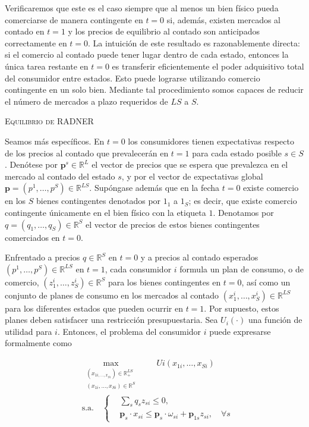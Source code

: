 \documentclass[10pt,a4paper]{article}
\begin{document}
Verificaremos que este es el caso siempre que al menos un bien físico pueda comerciarse de manera contingente en $t=0$ si, además, existen mercados al contado en $t=1$ y los precios de equilibrio al contado son anticipados correctamente en $t=0$. La intuición de este resultado es razonablemente directa: si el comercio al contado puede tener lugar dentro de cada estado, entonces la única tarea restante en $t=0$ es transferir eficientemente el poder adquisitivo total del consumidor entre estados. Esto puede lograrse utilizando comercio contingente en un solo bien. Mediante tal procedimiento somos capaces de reducir el número de mercados a plazo requeridos de $LS$ a $S$.

\textsc{Equilibrio de RADNER}

Seamos más específicos. En $t=0$ los consumidores tienen expectativas respecto de los precios al contado que prevalecerán en $t=1$ para cada estado posible $s\in S$. Denótese por $\mathbf p^s\in\mathbb{R}^L$ el vector de precios que se espera que prevalezca en el mercado al contado del estado $s$, y por el vector de expectativas global $\mathbf p=(p^1,\ldots,p^S)\in\mathbb{R}^{LS}$. Supóngase además que en la fecha $t=0$ existe comercio en los $S$ bienes contingentes denotados por $1_1$ a $1_S$; es decir, que existe comercio contingente únicamente en el bien físico con la etiqueta $1$. Denotamos por $q=(q_1,\ldots,q_S)\in\mathbb{R}^S$ el vector de precios de estos bienes contingentes comerciados en $t=0$.

Enfrentado a precios $q\in\mathbb{R}^S$ en $t=0$ y a precios al contado esperados $(p^1,\ldots,p^S)\in\mathbb{R}^{LS}$ en $t=1$, cada consumidor $i$ formula un plan de consumo, o de comercio, $(z^i_1,\ldots,z^i_S)\in\mathbb{R}^S$ para los bienes contingentes en $t=0$, así como un conjunto de planes de consumo en los mercados al contado $(x^i_1,\ldots,x^i_S)\in\mathbb{R}^{LS}$ para los diferentes estados que pueden ocurrir en $t=1$. Por supuesto, estos planes deben satisfacer una restricción presupuestaria. Sea $U_i(\cdot)$ una función de utilidad para $i$. Entonces, el problema del consumidor $i$ puede expresarse formalmente como

$$\begin{aligned}
    &\max_{\begin{aligned}
        (x_{1i,\ldots,x_{Si}})\in\mathbb R^{LS}_+\\[0.5em]
        (x_{1i},\ldots,x_{Si})\in\mathbb R^{S}
    \end{aligned}}\qquad Ui(x_{1i},\ldots,x_{Si})\\[1em]
    &\text{s.a.}\quad \left\{\begin{aligned}
        &\sum_{s}q_sz_{si}\leq0,\\
        &\mathbf p_s\cdot x_{si}\leq \mathbf p_s\cdot \omega_{si}+\mathbf p_{1s}z_{si},\quad \forall s
    \end{aligned}\right.
\end{aligned}$$
\end{document}
